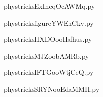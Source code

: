     \newcommand{\CaptionFigExIneqOcAWMq}{<+Type your caption here+>}
    \begin{center}
        
    \end{center}
    phystricksExIneqOcAWMq.py

    

    \clearpage
    


    \newcommand{\CaptionFigfigureYWEhCkv}{<+Type your caption here+>}
    \begin{center}
        
    \end{center}
    phystricksfigureYWEhCkv.py

    

    \clearpage
    


    \newcommand{\CaptionFigHXDOooHsfhus}{<+Type your caption here+>}
    \begin{center}
        
    \end{center}
    phystricksHXDOooHsfhus.py

    

    \clearpage
    


    \newcommand{\CaptionFigMJZoobAMRb}{<+Type your caption here+>}
    \begin{center}
        
    \end{center}
    phystricksMJZoobAMRb.py

    

    \clearpage
    


    \newcommand{\CaptionFigIFTGooWtjCeQ}{<+Type your caption here+>}
    \begin{center}
        
    \end{center}
    phystricksIFTGooWtjCeQ.py

    

    \clearpage
    


    \newcommand{\CaptionFigSRYNooEdaMMH}{<+Type your caption here+>}
    \begin{center}
        
    \end{center}
    phystricksSRYNooEdaMMH.py

